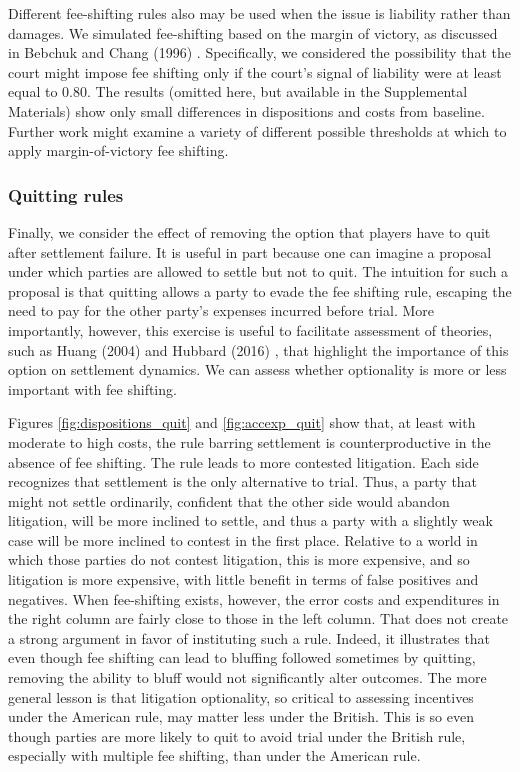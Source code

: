 \documentclass{article}
\begin{document}
Different fee-shifting rules also may be used when the issue is liability rather than damages. We simulated fee-shifting based on the margin of victory, as discussed in Bebchuk and Chang (1996) \cite{bebchukchang}. Specifically, we considered the possibility that the court might impose fee shifting only if the court's signal of liability were at least equal to 0.80. The results (omitted here, but available in the Supplemental Materials) show only small differences in dispositions and costs from baseline. Further work might examine a variety of different possible thresholds at which to apply margin-of-victory fee shifting.

\subsubsection{Quitting rules}

Finally, we consider the effect of removing the option that players have to quit after settlement failure. It is  useful in part because one can imagine a proposal under which parties are allowed to settle but not to quit. The intuition for such a proposal is that quitting allows a party to evade the fee shifting rule, escaping the need to pay for the other party's expenses incurred before trial. More importantly, however, this exercise is useful to facilitate assessment of theories, such as Huang (2004) \cite{huang} and Hubbard (2016) \cite{hubbard}, that highlight the importance of this option on settlement dynamics. We can assess whether optionality is more or less important with fee shifting.

Figures \ref{fig:dispositions_quit} and \ref{fig:accexp_quit} show that, at least with moderate to high costs, the rule barring settlement is counterproductive in the absence of fee shifting. The rule leads to more contested litigation. Each side recognizes that settlement is the only alternative to trial. Thus, a party that might not settle ordinarily, confident that the other side would abandon litigation, will be more inclined to settle, and thus a party with a slightly weak case will be more inclined to contest in the first place. Relative to a world in which those parties do not contest litigation, this is more expensive, and so litigation is more expensive, with little benefit in terms of false positives and negatives. When fee-shifting exists, however, the error costs and expenditures in the right column are fairly close to those in the left column. That does not create a strong argument in favor of instituting such a rule. Indeed, it illustrates that even though fee shifting can lead to bluffing followed sometimes by quitting, removing the ability to bluff would not significantly alter outcomes. The more general lesson is that litigation optionality, so critical to assessing incentives under the American rule, may matter less under the British. This is so even though parties are more likely to quit to avoid trial under the British rule, especially with multiple fee shifting, than under the American rule. 
\end{document}
